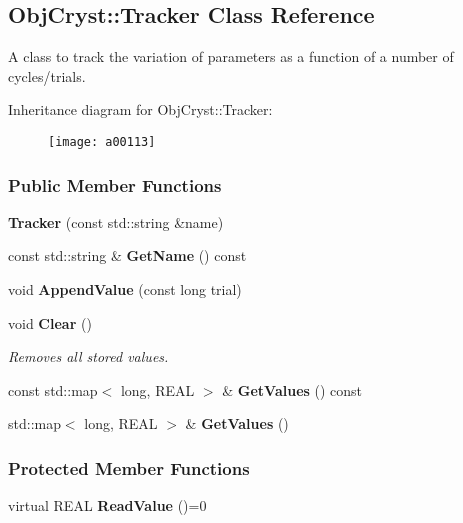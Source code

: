 \subsection{Obj\-Cryst\-:\-:Tracker Class Reference}
\label{a00113}


A class to track the variation of parameters as a function of a number of cycles/trials.  


Inheritance diagram for Obj\-Cryst\-:\-:Tracker\-:\begin{figure}[H]
\begin{center}
\leavevmode
\texttt{[image: a00113]}
\end{center}
\end{figure}
\subsubsection*{Public Member Functions}
\begin{DoxyCompactItemize}
\item 
{\bfseries Tracker} (const std\-::string \&name)\label{a00113_a57d89249ba910902e6ef6a33dcd3ee8c}

\item 
const std\-::string \& {\bfseries Get\-Name} () const \label{a00113_ad93197775f7d0a3b52eb199a9ed1c958}

\item 
void {\bfseries Append\-Value} (const long trial)\label{a00113_ae50d08700a131d280f8a19a58274bfe7}

\item 
void {\bf Clear} ()\label{a00113_abdac1cff42cfd8d66e10977a5a9066b3}

\begin{DoxyCompactList}\small\item\em Removes all stored values. \end{DoxyCompactList}\item 
const std\-::map$<$ long, R\-E\-A\-L $>$ \& {\bfseries Get\-Values} () const \label{a00113_a882fe8d7c193662613d4a9ab262a2417}

\item 
std\-::map$<$ long, R\-E\-A\-L $>$ \& {\bfseries Get\-Values} ()\label{a00113_a4f889b0d29a403c597040c5b88f4ffa8}

\end{DoxyCompactItemize}
\subsubsection*{Protected Member Functions}
\begin{DoxyCompactItemize}
\item 
virtual R\-E\-A\-L {\bfseries Read\-Value} ()=0\label{a00113_a14096d99b76d3ffac16553f6434f97ce}

\end{DoxyCompactItemize}

